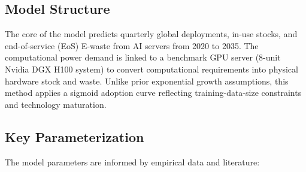 \documentclass[a4paper, 12pt]{article}
\begin{document}
\subsection{Model Structure}
The core of the model predicts quarterly global deployments, in-use stocks, and end-of-service (EoS) E-waste from AI servers from 2020 to 2035. The computational power demand is linked to a benchmark GPU server (8-unit Nvidia DGX H100 system) to convert computational requirements into physical hardware stock and waste. Unlike prior exponential growth assumptions, this method applies a sigmoid adoption curve reflecting training-data-size constraints and technology maturation.

\subsection{Key Parameterization}
The model parameters are informed by empirical data and literature:
\end{document}
